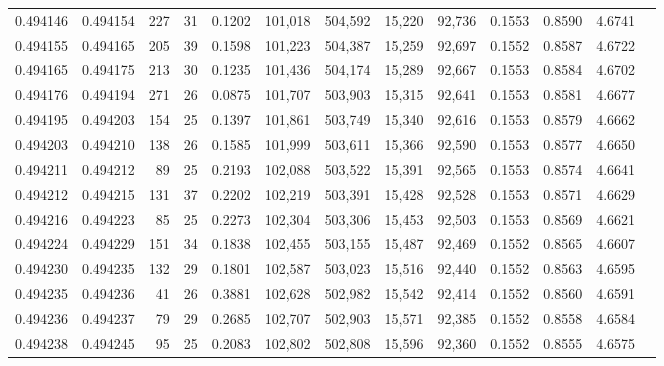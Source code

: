 \begin{tabular}{rrrrrrrrrrrrr}
0.494146 & 0.494154 & 227 &  31 &                                     0.1202 & 101,018 & 504,592 &  15,220 &  92,736 & 0.1553 & 0.8590 & 4.6741 \\
0.494155 & 0.494165 & 205 &  39 &                                     0.1598 & 101,223 & 504,387 &  15,259 &  92,697 & 0.1552 & 0.8587 & 4.6722 \\
0.494165 & 0.494175 & 213 &  30 &                                     0.1235 & 101,436 & 504,174 &  15,289 &  92,667 & 0.1553 & 0.8584 & 4.6702 \\
0.494176 & 0.494194 & 271 &  26 &                                     0.0875 & 101,707 & 503,903 &  15,315 &  92,641 & 0.1553 & 0.8581 & 4.6677 \\
0.494195 & 0.494203 & 154 &  25 &                                     0.1397 & 101,861 & 503,749 &  15,340 &  92,616 & 0.1553 & 0.8579 & 4.6662 \\
0.494203 & 0.494210 & 138 &  26 &                                     0.1585 & 101,999 & 503,611 &  15,366 &  92,590 & 0.1553 & 0.8577 & 4.6650 \\
0.494211 & 0.494212 &  89 &  25 &                                     0.2193 & 102,088 & 503,522 &  15,391 &  92,565 & 0.1553 & 0.8574 & 4.6641 \\
0.494212 & 0.494215 & 131 &  37 &                                     0.2202 & 102,219 & 503,391 &  15,428 &  92,528 & 0.1553 & 0.8571 & 4.6629 \\
0.494216 & 0.494223 &  85 &  25 &                                     0.2273 & 102,304 & 503,306 &  15,453 &  92,503 & 0.1553 & 0.8569 & 4.6621 \\
0.494224 & 0.494229 & 151 &  34 &                                     0.1838 & 102,455 & 503,155 &  15,487 &  92,469 & 0.1552 & 0.8565 & 4.6607 \\
0.494230 & 0.494235 & 132 &  29 &                                     0.1801 & 102,587 & 503,023 &  15,516 &  92,440 & 0.1552 & 0.8563 & 4.6595 \\
0.494235 & 0.494236 &  41 &  26 &                                     0.3881 & 102,628 & 502,982 &  15,542 &  92,414 & 0.1552 & 0.8560 & 4.6591 \\
0.494236 & 0.494237 &  79 &  29 &                                     0.2685 & 102,707 & 502,903 &  15,571 &  92,385 & 0.1552 & 0.8558 & 4.6584 \\
0.494238 & 0.494245 &  95 &  25 &                                     0.2083 & 102,802 & 502,808 &  15,596 &  92,360 & 0.1552 & 0.8555 & 4.6575 \\

\end{tabular}
